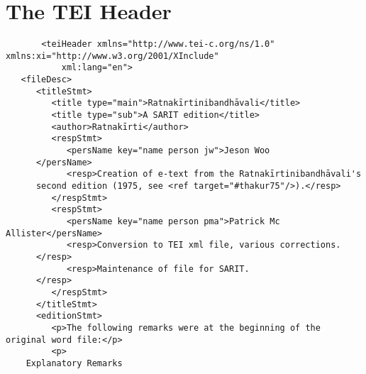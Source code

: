 \documentclass[article,a4paper]{memoir}
\begin{document}
	 \chapter{The TEI Header}
	 \begin{landscape}
	 \begin{verbatim}
       <teiHeader xmlns="http://www.tei-c.org/ns/1.0" xmlns:xi="http://www.w3.org/2001/XInclude"
           xml:lang="en">
   <fileDesc>
      <titleStmt>
         <title type="main">Ratnakīrtinibandhāvali</title>
         <title type="sub">A SARIT edition</title>
         <author>Ratnakīrti</author>
         <respStmt>
            <persName key="name person jw">Jeson Woo
	  </persName>
            <resp>Creation of e-text from the Ratnakīrtinibandhāvali's
	  second edition (1975, see <ref target="#thakur75"/>).</resp>
         </respStmt>
         <respStmt>
            <persName key="name person pma">Patrick Mc Allister</persName>
            <resp>Conversion to TEI xml file, various corrections.
	  </resp>
            <resp>Maintenance of file for SARIT.
	  </resp>
         </respStmt>
      </titleStmt>
      <editionStmt>
         <p>The following remarks were at the beginning of the original word file:</p>
         <p>
	Explanatory Remarks


\end{verbatim}
\end{landscape}
\end{document}
